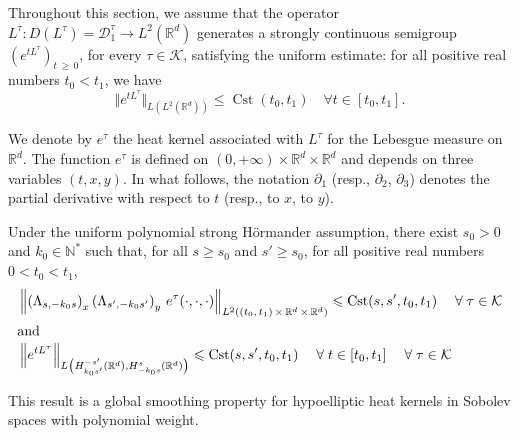 \documentclass[10pt]{amsart}
\theoremstyle{definition}\newtheorem{defi}[theo]{Definition}\newtheorem{rema}[theo]{Remark}\newtheorem{exam}[theo]{Example}\newtheorem{exem}[theo]{Example}\newtheorem{nota}[theo]{Notation}
\newcommand*\R{\mathbb{R}}
\newcommand*\N{\mathbb{N}}
\newcommand{\calK}{\mathcal{K}}
\newcommand{\calD}{\mathcal{D}}
\DeclareMathOperator{\Cst}{Cst}
\renewcommand{\geq}{\geqslant}
\renewcommand{\leq}{\leqslant}
\let\oldforall\forall
\renewcommand*{\forall}{\mathrel{\oldforall}}
\begin{document}
Throughout this section, we assume that the operator $L^\tau: D(L^\tau)=\calD^\tau_1\rightarrow L^2(\R^d)$ generates a strongly continuous semigroup $(e^{tL^\tau})_{t\,\geq\,0}$, for every $\tau\in\calK$, satisfying the uniform estimate: for all positive real numbers $t_0<t_1$, we have
\begin{equation}\label{13:05}
\Vert e^{tL^\tau}\Vert_{L\left(L^2\left(\R^d\right)\right)}\leq \Cst(t_0,t_1) \quad\forall t\in[t_0,t_1].
\end{equation}


We denote by $e^\tau$ the heat kernel associated with $L^\tau$ for the Lebesgue measure on $\R^d$. The function $e^\tau$ is defined on $(0,+\infty)\times\R^d\times\R^d$ and depends on three variables $(t,x,y)$. In what follows, the notation $\partial_1$ (resp., $\partial_2$, $\partial_3$) denotes the partial derivative with respect to $t$ (resp., to $x$, to $y$).


\begin{coro}\label{cor_heat_uniform_global}
Under the uniform polynomial strong H\"ormander assumption, there exist $s_0>0$ and $k_0\in\N^*$ such that, for all $s\geq s_0$ and $s'\geq s_0$, for all positive real numbers $0<t_0<t_1$,
\begin{align*}
&\left\Vert \left(\Lambda_{s,-k_0s}\right)_x \left(\Lambda_{s',-k_0s'}\right)_{y}\, e^\tau(\cdot,\cdot,\cdot) \right\Vert_{L^2\left((t_0,\,t_1)\,\times\,\R^d\,\times\,\R^d\right)}\leq \Cst(s,s',t_0,t_1) \quad \forall \tau\in\calK
\\
\intertext{and}
& \left\Vert e^{t L^\tau} \right\Vert_{L\left(H^{-s'}_{k_0s'}\left(\R^d\right), H^{s}_{-k_0s}\left(\R^d\right)\right)}
\leq \Cst(s,s',t_0,t_1)
\quad \forall t\in[t_0,t_1]\quad \forall \tau\in\calK
\end{align*}
\end{coro}

This result is a global smoothing property for hypoelliptic heat kernels in Sobolev spaces with polynomial weight.
\end{document}
